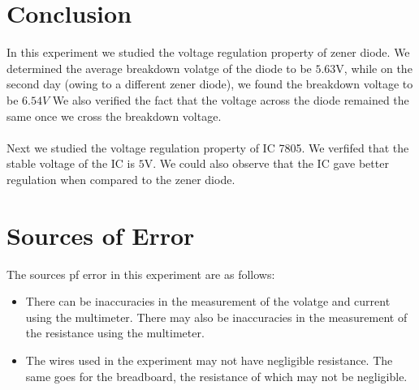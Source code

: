 \documentclass[12pt]{article}
\begin{document}
\section{Conclusion}
In this experiment we studied the voltage regulation property of zener diode. We determined the average breakdown volatge of the diode to be $5.63 $V, while on the second day (owing to a different zener diode), we found the breakdown voltage to be $6.54 V$ We also verified the fact that the voltage across the diode remained the same once we cross the breakdown voltage.\\
\\
Next we studied the voltage regulation property of IC 7805. We verfifed that the stable voltage of the IC is $5$V. We could also observe that the IC gave better regulation when compared to the zener diode.
\newpage
\section{Sources of Error}
The sources pf error in this experiment are as follows:
\begin{itemize}
	\item There can be inaccuracies in the measurement of the volatge and current using the multimeter. There may also be inaccuracies in the measurement of the resistance using the multimeter.
	\item The wires used in the experiment may not have negligible resistance. The same goes for the breadboard, the resistance of which may not be negligible.
\end{itemize}
\end{document}
